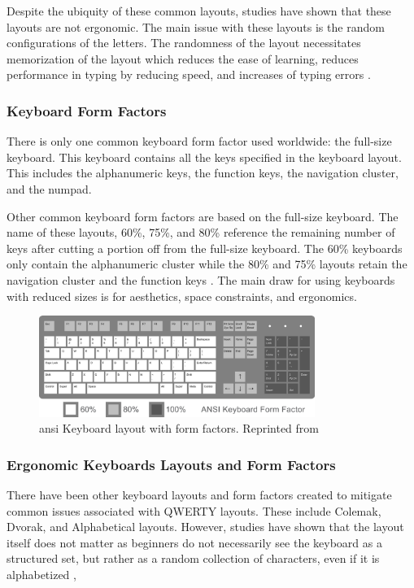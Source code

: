 \documentclass{report}
\begin{document}
Despite the ubiquity of these common layouts, studies have shown that these
layouts are not ergonomic. The main issue with these layouts is the random
configurations of the letters. The randomness of the layout necessitates
memorization of the layout which reduces the ease of learning, reduces performance
in typing by reducing speed, and increases of typing errors
\parencite{ciobanu2015}.

\subsubsection{Keyboard Form Factors}

There is only one common keyboard form factor used worldwide: the full-size
keyboard. This keyboard contains all the keys specified in the keyboard
layout. This includes the alphanumeric keys, the function keys, the navigation
cluster, and the numpad.

Other common keyboard form factors are based on the full-size keyboard. The name
of these layouts, 60\%, 75\%, and 80\% reference the remaining number of keys
after cutting a portion off from the full-size keyboard. The 60\% keyboards only
contain the alphanumeric cluster while the 80\% and 75\% layouts retain the
navigation cluster and the function keys \parencite{parkkinen2018}. The main
draw for using keyboards with reduced sizes is for aesthetics, space
constraints, and ergonomics.

\begin{figure}[H]
	\centering
	\includegraphics[width=0.8\textwidth]{ansi.png}
	\caption{\ac{ansi} Keyboard layout with form factors. Reprinted from }
	\label{fig:ansi}
	\centering
\end{figure}

\subsubsection{Ergonomic Keyboards Layouts and Form Factors}

There have been other keyboard layouts and form factors created to mitigate
common issues associated with QWERTY layouts. These include Colemak, Dvorak, and
Alphabetical layouts. However, studies have shown that the layout itself does
not matter as beginners do not necessarily see the keyboard as a structured set,
but rather as a random collection of characters, even if it is alphabetized
\parencite{norman1982},
\end{document}
